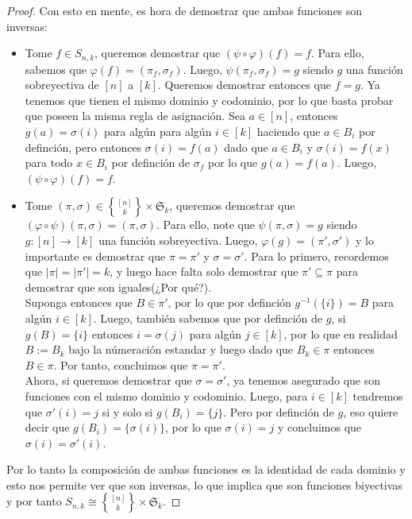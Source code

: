 \documentclass[12pt,a4paper,oneside]{memoir}
\DeclareRobustCommand{\stirling}{\genfrac\{\}{0pt}{}}
\begin{document}
\begin{proof}
    Con esto en mente, es hora de demostrar que ambas funciones son inversas:
    \begin{itemize}
        \item Tome $f \in S_{n, k}$, queremos demostrar que $(\psi \circ \varphi)(f) = f$. Para ello, sabemos que $\varphi(f) = (\pi_f, \sigma_f)$. Luego, $\psi(\pi_f, \sigma_f) = g$ siendo $g$ una función sobreyectiva de $[n]$ a $[k]$. Queremos demostrar entonces que $f = g$. Ya tenemos que tienen el mismo dominio y codominio, por lo que basta probar que poseen la misma regla de asignación. Sea $a \in [n]$, entonces $g(a) = \sigma(i)$ para algún para algún $i \in [k]$ haciendo que $a \in B_i$ por definción, pero entonces $\sigma(i) = f(a)$ dado que $a \in B_i$ y $\sigma(i)  = f(x)$ para todo $x \in B_i$ por definción de $\sigma_f$ por lo que $g(a) = f(a)$. Luego, $(\psi \circ \varphi)(f) = f$.
        \item Tome $(\pi, \sigma) \in \stirling{[n]}{k} \times \mathfrak{S}_k$, queremos demostrar que $(\varphi \circ \psi)(\pi, \sigma) = (\pi, \sigma)$. Para ello, note que $\psi(\pi, \sigma) = g$ siendo $g: [n] \to [k]$ una función sobreyectiva. Luego, $\varphi(g) = (\pi', \sigma')$ y lo importante es demostrar que $\pi = \pi'$ y $\sigma = \sigma'$. Para lo primero, recordemos que $|\pi| = |\pi'| = k$, y luego hace falta solo demostrar que $\pi' \subseteq \pi$ para demostrar que son iguales(¿Por qué?).\\
        
        Suponga entonces que $B \in \pi'$, por lo que por definción $g^{-1}(\{i\}) = B$ para algún $i \in [k]$. Luego, también sabemos que por definción de $g$, si $g(B) = \{i\}$ entonces $i = \sigma(j)$ para algún $j \in [k]$, por lo que en realidad $B := B_k$ bajo la númeración estandar y luego dado que $B_k \in \pi$ entonces $B \in \pi$. Por tanto, concluimos que $\pi = \pi'$.\\

        Ahora, si queremos demostrar que $\sigma = \sigma'$, ya tenemos asegurado que son funciones con el mismo dominio y codominio. Luego, para $i \in [k]$ tendremos que $\sigma'(i) = j$ si y solo si $g(B_i) = \{j\}$. Pero por definción de $g$, eso quiere decir que $g(B_i) = \{\sigma(i)\}$, por lo que $\sigma(i) = j$ y concluimos que $\sigma(i) = \sigma'(i)$.
    \end{itemize}
    Por lo tanto la composición de ambas funciones es la identidad de cada dominio y esto nos permite ver que son inversas, lo que implica que son funciones biyectivas y por tanto $S_{n, k} \cong \stirling{[n]}{k} \times \mathfrak{S}_k$.
\end{proof}
\end{document}

